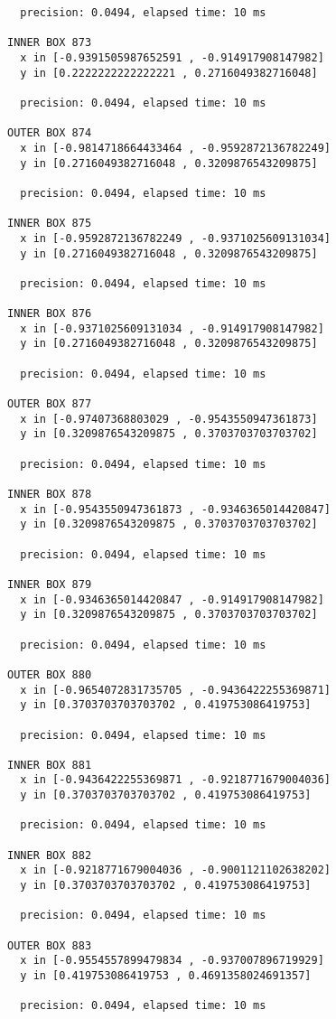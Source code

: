 \begin{verbatim}
  precision: 0.0494, elapsed time: 10 ms

INNER BOX 873
  x in [-0.9391505987652591 , -0.914917908147982]
  y in [0.2222222222222221 , 0.2716049382716048]

  precision: 0.0494, elapsed time: 10 ms

OUTER BOX 874
  x in [-0.9814718664433464 , -0.9592872136782249]
  y in [0.2716049382716048 , 0.3209876543209875]

  precision: 0.0494, elapsed time: 10 ms

INNER BOX 875
  x in [-0.9592872136782249 , -0.9371025609131034]
  y in [0.2716049382716048 , 0.3209876543209875]

  precision: 0.0494, elapsed time: 10 ms

INNER BOX 876
  x in [-0.9371025609131034 , -0.914917908147982]
  y in [0.2716049382716048 , 0.3209876543209875]

  precision: 0.0494, elapsed time: 10 ms

OUTER BOX 877
  x in [-0.97407368803029 , -0.9543550947361873]
  y in [0.3209876543209875 , 0.3703703703703702]

  precision: 0.0494, elapsed time: 10 ms

INNER BOX 878
  x in [-0.9543550947361873 , -0.9346365014420847]
  y in [0.3209876543209875 , 0.3703703703703702]

  precision: 0.0494, elapsed time: 10 ms

INNER BOX 879
  x in [-0.9346365014420847 , -0.914917908147982]
  y in [0.3209876543209875 , 0.3703703703703702]

  precision: 0.0494, elapsed time: 10 ms

OUTER BOX 880
  x in [-0.9654072831735705 , -0.9436422255369871]
  y in [0.3703703703703702 , 0.419753086419753]

  precision: 0.0494, elapsed time: 10 ms

INNER BOX 881
  x in [-0.9436422255369871 , -0.9218771679004036]
  y in [0.3703703703703702 , 0.419753086419753]

  precision: 0.0494, elapsed time: 10 ms

INNER BOX 882
  x in [-0.9218771679004036 , -0.9001121102638202]
  y in [0.3703703703703702 , 0.419753086419753]

  precision: 0.0494, elapsed time: 10 ms

OUTER BOX 883
  x in [-0.9554557899479834 , -0.937007896719929]
  y in [0.419753086419753 , 0.4691358024691357]

  precision: 0.0494, elapsed time: 10 ms


\end{verbatim}
